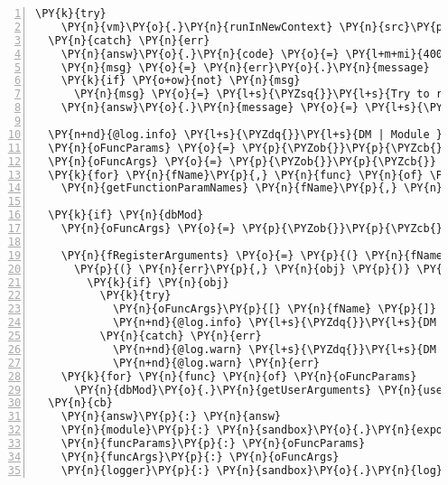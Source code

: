 \begin{Verbatim}[fontsize=\scriptsize,commandchars=\\\{\},numbers=left,firstnumber=1,stepnumber=1]
  \PY{k}{try}
    \PY{n}{vm}\PY{o}{.}\PY{n}{runInNewContext} \PY{n}{src}\PY{p}{,} \PY{n}{sandbox}\PY{p}{,} \PY{n}{sandbox}\PY{o}{.}\PY{n}{id}
  \PY{n}{catch} \PY{n}{err}
    \PY{n}{answ}\PY{o}{.}\PY{n}{code} \PY{o}{=} \PY{l+m+mi}{400}
    \PY{n}{msg} \PY{o}{=} \PY{n}{err}\PY{o}{.}\PY{n}{message}
    \PY{k}{if} \PY{o+ow}{not} \PY{n}{msg}
      \PY{n}{msg} \PY{o}{=} \PY{l+s}{\PYZsq{}}\PY{l+s}{Try to run the script locally to track the error! Sadly we cannot provide the line number}\PY{l+s}{\PYZsq{}}
    \PY{n}{answ}\PY{o}{.}\PY{n}{message} \PY{o}{=} \PY{l+s}{\PYZsq{}}\PY{l+s}{Loading Module failed: }\PY{l+s}{\PYZsq{}} \PY{o}{+} \PY{n}{msg}

  \PY{n+nd}{@log.info} \PY{l+s}{\PYZdq{}}\PY{l+s}{DM | Module }\PY{l+s}{\PYZsq{}}\PY{l+s}{\PYZsh{}\PYZob{} modId \PYZcb{}}\PY{l+s}{\PYZsq{}}\PY{l+s}{ ran successfully for user }\PY{l+s}{\PYZsq{}}\PY{l+s}{\PYZsh{}\PYZob{} userId \PYZcb{}}\PY{l+s}{\PYZsq{}}\PY{l+s}{ in rule }\PY{l+s}{\PYZsq{}}\PY{l+s}{\PYZsh{}\PYZob{} oRule.id \PYZcb{}}\PY{l+s}{\PYZsq{}}\PY{l+s}{\PYZdq{}}
  \PY{n}{oFuncParams} \PY{o}{=} \PY{p}{\PYZob{}}\PY{p}{\PYZcb{}}
  \PY{n}{oFuncArgs} \PY{o}{=} \PY{p}{\PYZob{}}\PY{p}{\PYZcb{}}
  \PY{k}{for} \PY{n}{fName}\PY{p}{,} \PY{n}{func} \PY{n}{of} \PY{n}{sandbox}\PY{o}{.}\PY{n}{exports}
    \PY{n}{getFunctionParamNames} \PY{n}{fName}\PY{p}{,} \PY{n}{func}\PY{p}{,} \PY{n}{oFuncParams}

  \PY{k}{if} \PY{n}{dbMod}
    \PY{n}{oFuncArgs} \PY{o}{=} \PY{p}{\PYZob{}}\PY{p}{\PYZcb{}}

    \PY{n}{fRegisterArguments} \PY{o}{=} \PY{p}{(} \PY{n}{fName} \PY{p}{)} \PY{o}{=}\PY{o}{\PYZgt{}}
      \PY{p}{(} \PY{n}{err}\PY{p}{,} \PY{n}{obj} \PY{p}{)} \PY{o}{=}\PY{o}{\PYZgt{}}
        \PY{k}{if} \PY{n}{obj}
          \PY{k}{try}
            \PY{n}{oFuncArgs}\PY{p}{[} \PY{n}{fName} \PY{p}{]} \PY{o}{=} \PY{n}{JSON}\PY{o}{.}\PY{n}{parse} \PY{n}{obj}
            \PY{n+nd}{@log.info} \PY{l+s}{\PYZdq{}}\PY{l+s}{DM | Found user\PYZhy{}specific arguments to \PYZsh{}\PYZob{} userId \PYZcb{}, \PYZsh{}\PYZob{} oRule.id \PYZcb{}, \PYZsh{}\PYZob{} modId \PYZcb{}: \PYZsh{}\PYZob{} obj \PYZcb{}}\PY{l+s}{\PYZdq{}}
          \PY{n}{catch} \PY{n}{err}
            \PY{n+nd}{@log.warn} \PY{l+s}{\PYZdq{}}\PY{l+s}{DM | Error parsing user\PYZhy{}specific arguments for \PYZsh{}\PYZob{} userId \PYZcb{}, \PYZsh{}\PYZob{} oRule.id \PYZcb{}, \PYZsh{}\PYZob{} modId \PYZcb{}}\PY{l+s}{\PYZdq{}}
            \PY{n+nd}{@log.warn} \PY{n}{err}
    \PY{k}{for} \PY{n}{func} \PY{n}{of} \PY{n}{oFuncParams}
      \PY{n}{dbMod}\PY{o}{.}\PY{n}{getUserArguments} \PY{n}{userId}\PY{p}{,} \PY{n}{oRule}\PY{o}{.}\PY{n}{id}\PY{p}{,} \PY{n}{modId}\PY{p}{,} \PY{n}{func}\PY{p}{,} \PY{n}{fRegisterArguments} \PY{n}{func}
  \PY{n}{cb}
    \PY{n}{answ}\PY{p}{:} \PY{n}{answ}
    \PY{n}{module}\PY{p}{:} \PY{n}{sandbox}\PY{o}{.}\PY{n}{exports}
    \PY{n}{funcParams}\PY{p}{:} \PY{n}{oFuncParams}
    \PY{n}{funcArgs}\PY{p}{:} \PY{n}{oFuncArgs}
    \PY{n}{logger}\PY{p}{:} \PY{n}{sandbox}\PY{o}{.}\PY{n}{log}
\end{Verbatim}
